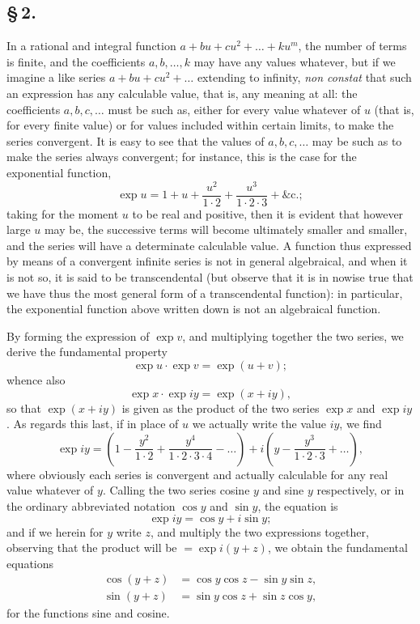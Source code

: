 \documentclass[11pt,a4paper]{article}
\begin{document}
\subsection*{\S\,2.}

In a rational and integral function $a + bu + cu^{2} + \ldots + ku^{m}$, the number of terms is finite, and the coefficients $a, b, \ldots, k$ may have any values whatever, but if we imagine a like series $a + bu + cu^{2} + \ldots$ extending to infinity, \textit{non constat} that such an expression has any calculable value, that is, any meaning at all: the coefficients $a, b, c, \ldots$ must be such as, either for every value whatever of $u$ (that is, for every finite value) or for values included within certain limits, to make the series convergent. It is easy to see that the values of $a, b, c, \ldots$ may be such as to make the series always convergent; for instance, this is the case for the exponential function,
\[
\exp u = 1 + u + \frac{u^{2}}{1 \cdot 2} + \frac{u^{3}}{1 \cdot 2 \cdot 3} + \&\text{c.};
\]
taking for the moment $u$ to be real and positive, then it is evident that however large $u$ may be, the successive terms will become ultimately smaller and smaller, and the series will have a determinate calculable value. A function thus expressed by means of a convergent infinite series is not in general algebraical, and when it is not so, it is said to be transcendental (but observe that it is in nowise true that we have thus the most general form of a transcendental function): in particular, the exponential function above written down is not an algebraical function.

By forming the expression of $\exp v$, and multiplying together the two series, we derive the fundamental property
\[
\exp u \cdot \exp v = \exp(u + v);
\]
whence also
\[
\exp x \cdot \exp iy = \exp(x + iy),
\]
so that $\exp(x + iy)$ is given as the product of the two series $\exp x$ and $\exp iy$. As regards this last, if in place of $u$ we actually write the value $iy$, we find
\[
\exp iy = \left(1 - \frac{y^{2}}{1 \cdot 2} + \frac{y^{4}}{1 \cdot 2 \cdot 3 \cdot 4} - \ldots\right) + i\left(y - \frac{y^{3}}{1 \cdot 2 \cdot 3} + \ldots\right),
\]
where obviously each series is convergent and actually calculable for any real value whatever of $y$. Calling the two series cosine $y$ and sine $y$ respectively, or in the ordinary abbreviated notation $\cos y$ and $\sin y$, the equation is
\[
\exp iy = \cos y + i \sin y;
\]
and if we herein for $y$ write $z$, and multiply the two expressions together, observing that the product will be $= \exp i(y + z)$, we obtain the fundamental equations
\begin{align*}
\cos(y + z) &= \cos y \cos z - \sin y \sin z, \\
\sin(y + z) &= \sin y \cos z + \sin z \cos y,
\end{align*}
for the functions sine and cosine.
\end{document}
